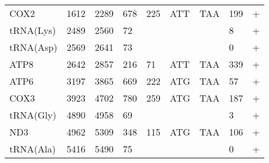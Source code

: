 \documentclass[../DISSERTACAO_MAIN.tex]{subfiles}
\begin{document}
\begin{longtable}{llllllllllllllllllllll}
			COX2         & 1612           & \multicolumn{2}{l}{2289}  & \multicolumn{2}{l}{678}        & \multicolumn{3}{l}{225}                       & \multicolumn{3}{l}{ATT}           & \multicolumn{3}{l}{TAA}   & \multicolumn{3}{l}{199}         & \multicolumn{4}{l}{+}                  \\
			tRNA(Lys)    & 2489           & \multicolumn{2}{l}{2560}  & \multicolumn{2}{l}{72}         & \multicolumn{3}{l}{}                          & \multicolumn{3}{l}{}              & \multicolumn{3}{l}{}      & \multicolumn{3}{l}{8}           & \multicolumn{4}{l}{+}                  \\
			tRNA(Asp)    & 2569           & \multicolumn{2}{l}{2641}  & \multicolumn{2}{l}{73}         & \multicolumn{3}{l}{}                          & \multicolumn{3}{l}{}              & \multicolumn{3}{l}{}      & \multicolumn{3}{l}{0}           & \multicolumn{4}{l}{+}                  \\
			ATP8         & 2642           & \multicolumn{2}{l}{2857}  & \multicolumn{2}{l}{216}        & \multicolumn{3}{l}{71}                        & \multicolumn{3}{l}{ATT}           & \multicolumn{3}{l}{TAA}   & \multicolumn{3}{l}{339}         & \multicolumn{4}{l}{+}                  \\
			ATP6         & 3197           & \multicolumn{2}{l}{3865}  & \multicolumn{2}{l}{669}        & \multicolumn{3}{l}{222}                       & \multicolumn{3}{l}{ATG}           & \multicolumn{3}{l}{TAA}   & \multicolumn{3}{l}{57}          & \multicolumn{4}{l}{+}                  \\
			COX3         & 3923           & \multicolumn{2}{l}{4702}  & \multicolumn{2}{l}{780}        & \multicolumn{3}{l}{259}                       & \multicolumn{3}{l}{ATG}           & \multicolumn{3}{l}{TAA}   & \multicolumn{3}{l}{187}         & \multicolumn{4}{l}{+}                  \\
			tRNA(Gly)    & 4890           & \multicolumn{2}{l}{4958}  & \multicolumn{2}{l}{69}         & \multicolumn{3}{l}{}                          & \multicolumn{3}{l}{}              & \multicolumn{3}{l}{}      & \multicolumn{3}{l}{3}           & \multicolumn{4}{l}{+}                  \\
			ND3          & 4962           & \multicolumn{2}{l}{5309}  & \multicolumn{2}{l}{348}        & \multicolumn{3}{l}{115}                       & \multicolumn{3}{l}{ATG}           & \multicolumn{3}{l}{TAA}   & \multicolumn{3}{l}{106}         & \multicolumn{4}{l}{+}                  \\
			tRNA(Ala)    & 5416           & \multicolumn{2}{l}{5490}  & \multicolumn{2}{l}{75}         & \multicolumn{3}{l}{}                          & \multicolumn{3}{l}{}              & \multicolumn{3}{l}{}      & \multicolumn{3}{l}{0}           & \multicolumn{4}{l}{+}                  \\

\end{longtable}
\end{document}
